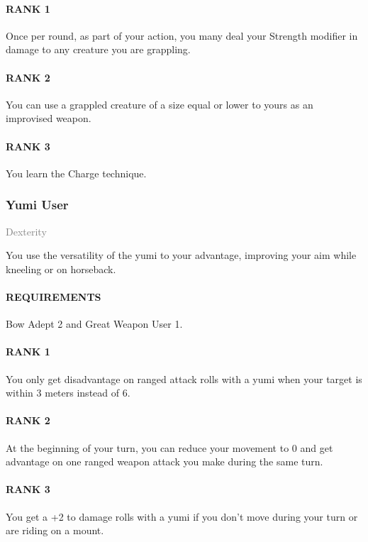 \paragraph{RANK 1} Once per round, as part of your action, you many deal your Strength modifier in damage to any creature you are grappling.
\paragraph{RANK 2} You can use a grappled creature of a size equal or lower to yours as an improvised weapon.
\paragraph{RANK 3} You learn the Charge technique.

\subsubsection{Yumi User} \label{feat::yumiuser}
\small{\textcolor{gray}{Dexterity}}

\normalsize
You use the versatility of the yumi to your advantage, improving your aim while kneeling or on horseback.
\paragraph{REQUIREMENTS} Bow Adept 2 and Great Weapon User 1.
\paragraph{RANK 1} You only get disadvantage on ranged attack rolls with a yumi when your target is within 3 meters instead of 6.
\paragraph{RANK 2} At the beginning of your turn, you can reduce your movement to 0 and get advantage on one ranged weapon attack you make during the same turn.
\paragraph{RANK 3} You get a +2 to damage rolls with a yumi if you don't move during your turn or are riding on a mount.

